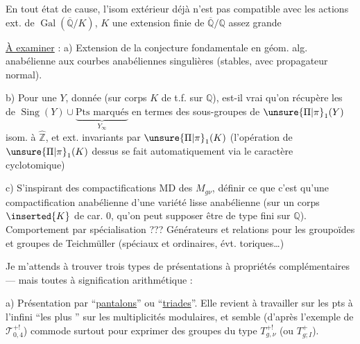 En tout état de cause,  l'isom extérieur déjà n'est pas compatible avec les actions ext. de $\operatorname{Gal}(\overline{\mathbb Q}/K)$, $K$  une extension finie de $\overline{\mathbb Q}/\mathbb Q$ assez grande


\uline{À examiner} : a) Extension de la conjecture fondamentale en géom. alg. anabélienne aux courbes anabéliennes  singulières (stables, avec propagateur normal). 

b) Pour une $Y$,  donnée (sur corps $K$ de t.f. sur $\mathbb Q$), est-il vrai qu'on récupère les  de  $\operatorname{Sing}(Y)\cup\underbrace{\text{Pts marqués}}_{Y_\infty}$ en termes des  sous-groupes de $\unsure{\Pi|\pi}_1(Y)$ isom. à $\widehat{\mathbb Z}$, et ext. invariants par $\unsure{\Pi|\pi}_1(K)$ (l'opération de $\unsure{\Pi|\pi}_1(K)$ dessus se fait automatiquement via le caractère cyclotomique)

c) S'inspirant des compactifications MD des $M_{g\nu}$, définir ce que c'est qu'une compactification anabélienne d'une variété lisse anabélienne (sur un corps $\inserted{K}$ de car. 0, qu'on peut supposer être de type fini sur $\mathbb Q$). Comportement par spécialisation ???
Générateurs et relations pour les groupoïdes et groupes de Teichmüller (spéciaux et ordinaires, évt. toriques\ldots)

Je m'attends à trouver trois types de présentations à propriétés complémentaires --- mais toutes à signification arithmétique :

a) Présentation par ``\uline{pantalons}'' ou ``\uline{triades}''. Elle revient à travailler sur les pts à l'infini ``les plus '' sur les multiplicités modulaires, et semble (d'après l'exemple de $\mathcal T_{0,4}^{+!}$) commode surtout pour exprimer des groupes du type $T_{g,\nu}^{+!}$ (ou $T_{g;I}^{+}$).

